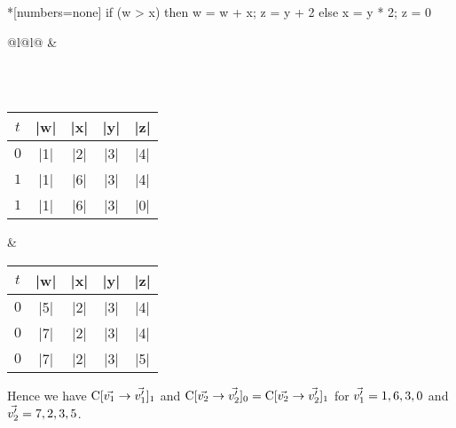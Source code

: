 \newsavebox\ifconectwoo
\begin{lrbox}{\ifconectwoo}
\begin{minipage}{5cm}
\begin{whilelisting}*[numbers=none]
if (w > x) then
  w = w + x;
  z = y + 2
else
  x = y * 2;
  z = 0
\end{whilelisting}
\end{minipage}
\end{lrbox}

\noindent%
\begin{tabularx}{\textwidth}{@{}l@{\hspace{2em}}l@{}}
\usebox\ifconectwoo &
\begin{tikzpicture}[baseline = 30pt, anchor=base, node distance=1cm]
\node (x) {\(\lvl{\prc|x|}\)};
\node (w) [above left  = .45cm and .08cm of x] {\(\lvl{\prc|w|}\)};
\node (y) [above right = .45cm and .08cm of x] {\(\lvl{\prc|y|}\)};
\node (z) [above right = .45cm and .08cm of w] {\(\lvl{\prc|z|}\)};
\draw[->] (x) -- (w);
\draw[->] (x) -- (y);
\draw[->] (w) -- (z);
\draw[->] (y) -- (z);
\begin{scope}[on background layer]
\node [fill=fillcolor, fit=(y), rounded corners=.3cm, inner sep=1pt, draw=fillborder] {};
\end{scope}
\end{tikzpicture}
\\ \\
\begin{tabular}{c || c >{\columncolor{fillcolor}}c >{\columncolor{fillcolor}}c c }
$t$ & \prc|w| & \prc|x| & \prc|y| & \prc|z| \\ \hline \hline
$0$ & \prc|1| & \prc|2| & \prc|3| & \prc|4| \\ \hline
$1$ & \prc|1| & \prc|6| & \prc|3| & \prc|4| \\
$1$ & \prc|1| & \prc|6| & \prc|3| & \prc|0|
\end{tabular}
&
\begin{tabular}{c || c >{\columncolor{fillcolor}}c >{\columncolor{fillcolor}}c c }
$t$ & \prc|w| & \prc|x| & \prc|y| & \prc|z| \\ \hline \hline
$0$ & \prc|5| & \prc|2| & \prc|3| & \prc|4| \\ \hline
$0$ & \prc|7| & \prc|2| & \prc|3| & \prc|4| \\
$0$ & \prc|7| & \prc|2| & \prc|3| & \prc|5|
\end{tabular}
\end{tabularx}

\noindent Hence we have \(\prc|C|[\vec{v_1} \rightarrow \vec{v_1'}]_1\) and
\(\prc|C|[\vec{v_2} \rightarrow \vec{v_2'}]_0 = \prc|C|[\vec{v_2} \rightarrow
\vec{v_2'}]_1\) for \(\vec{v_1'} = \prc|1|, \prc|6|, \prc|3|, \prc|0|\) and
\(\vec{v_2'} = \prc|7|, \prc|2|, \prc|3|, \prc|5|\).

